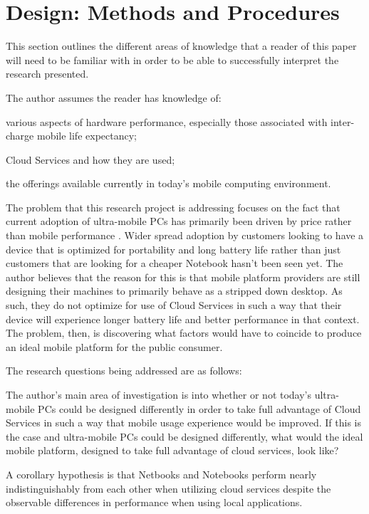 \section{Design: Methods and Procedures}

This section outlines the different areas of knowledge that a reader of this
paper will need to be familiar with in order to be able to successfully
interpret the research presented.

The author assumes the reader has knowledge of:
\begin{inparaenum}[(1)]
\item various aspects of hardware performance, especially those associated with
  inter-charge mobile life expectancy;
\item Cloud Services and how they are used;
\item the offerings available currently in today's mobile
  computing environment.
\end{inparaenum}

The problem that this research project is addressing focuses on the fact that
current adoption of ultra-mobile PCs has primarily been driven by price rather
than mobile performance \citep{ap2009}.  Wider spread adoption by customers
looking to have a device that is optimized for portability and long battery life
rather than just customers that are looking for a cheaper Notebook hasn't been
seen yet.  The author believes that the reason for this is that mobile platform
providers are still designing their machines to primarily behave as a stripped
down desktop.  As such, they do not optimize for use of Cloud Services in such a
way that their device will experience longer battery life and better performance
in that context.  The problem, then, is discovering what factors would have to
coincide to produce an ideal mobile platform for the public consumer.

The research questions being addressed are as follows:
\begin{inparaenum}[(1)]
  \item The author's main area of investigation is into whether or not today's
    ultra-mobile PCs could be designed differently in order to take full
    advantage of Cloud Services in such a way that mobile usage experience would
    be improved.  If this is the case and ultra-mobile PCs could be designed
    differently, what would the ideal mobile platform, designed to take full
    advantage of cloud services, look like?
  \item A corollary hypothesis is that Netbooks and Notebooks perform nearly
    indistinguishably from each other when utilizing cloud services despite the
    observable differences in performance when using local applications.
\end{inparaenum}

